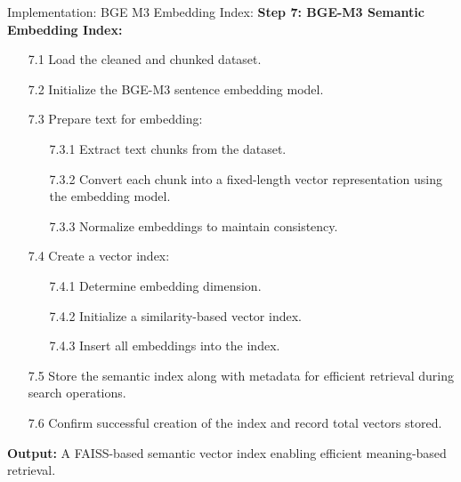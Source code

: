 \begin{frame}{Implementation: BGE M3 Embedding Index:}
    \textbf{Step 7: BGE-M3 Semantic Embedding Index:}
    \begin{itemize}
    
        \item[7.1] Load the cleaned and chunked dataset.
    
        \item[7.2] Initialize the BGE-M3 sentence embedding model.
    
        \item[7.3] Prepare text for embedding:
              \begin{itemize}
                  \item[7.3.1] Extract text chunks from the dataset.
                  \item[7.3.2] Convert each chunk into a fixed-length vector
                                representation using the embedding model.
                  \item[7.3.3] Normalize embeddings to maintain consistency.
              \end{itemize}
    
        \item[7.4] Create a vector index:
              \begin{itemize}
                  \item[7.4.1] Determine embedding dimension.
                  \item[7.4.2] Initialize a similarity-based vector index.
                  \item[7.4.3] Insert all embeddings into the index.
              \end{itemize}
    
        \item[7.5] Store the semantic index along with metadata
                  for efficient retrieval during search operations.
    
        \item[7.6] Confirm successful creation of the index and
                  record total vectors stored.
    
    \end{itemize}

\textbf{Output:} A FAISS-based semantic vector index enabling efficient meaning-based retrieval.

\end{frame}

